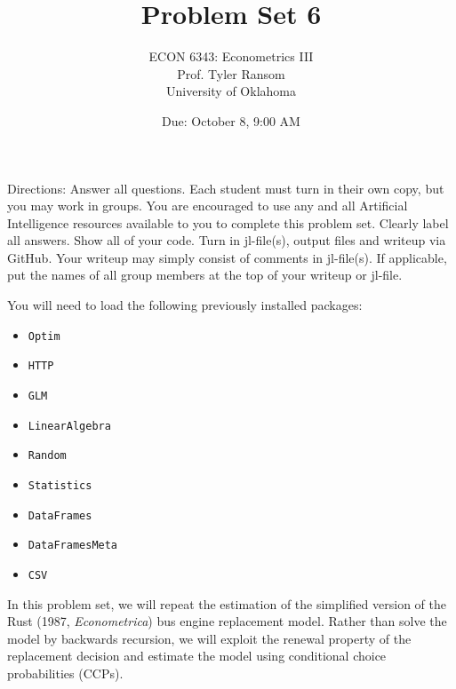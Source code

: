 \documentclass[12pt,english]{article}
\begin{document}
\title{Problem Set 6}
\author{ECON 6343: Econometrics III\\
Prof. Tyler Ransom\\
University of Oklahoma}
\date{Due: October 8, 9:00 AM}

\maketitle
Directions: Answer all questions. Each student must turn in their own copy, but you may work in groups. You are encouraged to use any and all Artificial Intelligence resources available to you to complete this problem set. Clearly label all answers. Show all of your code. Turn in jl-file(s), output files and writeup via GitHub. Your writeup may simply consist of comments in jl-file(s). If applicable, put the names of all group members at the top of your writeup or jl-file.


You will need to load the following previously installed packages:
\begin{itemize}
    \item[~] \texttt{Optim} 
    \item[~] \texttt{HTTP} 
    \item[~] \texttt{GLM} 
    \item[~] \texttt{LinearAlgebra} 
    \item[~] \texttt{Random} 
    \item[~] \texttt{Statistics} 
    \item[~] \texttt{DataFrames} 
    \item[~] \texttt{DataFramesMeta} 
    \item[~] \texttt{CSV} 
\end{itemize}
\pagebreak
In this problem set, we will repeat the estimation of the simplified version of the Rust (1987, \textit{Econometrica}) bus engine replacement model. Rather than solve the model by backwards recursion, we will exploit the renewal property of the replacement decision and estimate the model using conditional choice probabilities (CCPs). 
\end{document}
